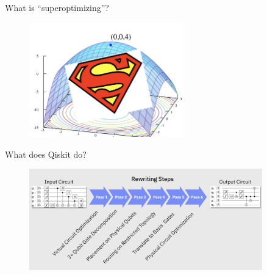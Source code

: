 \documentclass[11pt,aspectratio=1610,xcolor=dvipsnames]{beamer}
\begin{document}
\begin{frame}{What is ``superoptimizing''?}
	\begin{figure}[h]
		\centering
		\includegraphics[width=0.6\textwidth]{super-optim.png}
	\end{figure}
\end{frame}

\begin{frame}{What does Qiskit do?}
	\begin{figure}[h]
		\centering
		\includegraphics[width=0.9\textwidth]{qiskit.png}
	\end{figure}
\end{frame}
\end{document}
